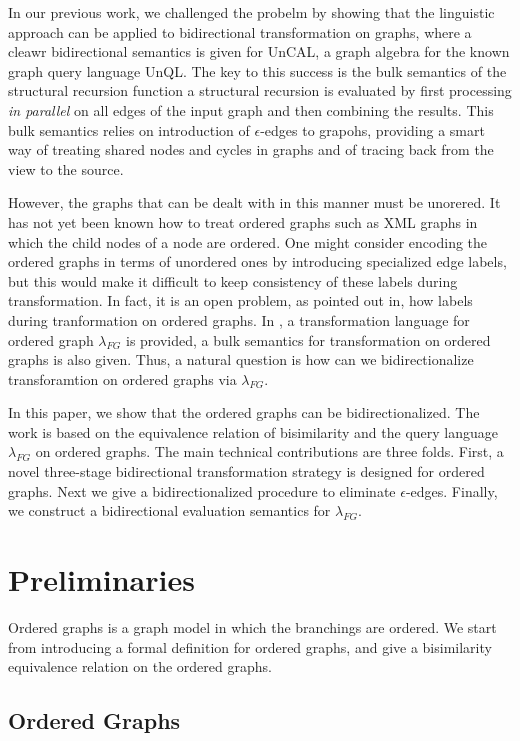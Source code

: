 \documentclass{llncs}
\begin{document}
In our previous work, we challenged the probelm by showing that the linguistic approach can be applied to bidirectional transformation on graphs, where a cleawr bidirectional semantics is given for UnCAL, a graph algebra for the known graph query language UnQL. The key to this success is the bulk semantics of the structural recursion function a structural recursion is evaluated by first processing \emph{in parallel} on all edges of the input graph and then combining the results. This bulk semantics relies on introduction of $\epsilon$-edges to grapohs, providing a smart way of treating shared nodes and cycles in graphs and of tracing back from the view to the source.

However, the graphs that can be dealt with in this manner must be unorered. It has not yet been known how to treat ordered graphs such as XML graphs in which the child nodes of a node are ordered. One might consider encoding the ordered graphs in terms of unordered ones by introducing specialized edge labels, but this would make it difficult to keep consistency of these labels during transformation. In fact, it is an open problem, as pointed out in, how labels during tranformation on ordered graphs. In , a transformation language for ordered graph $\lambda_{FG}$ is provided, a bulk semantics for transformation on ordered graphs is also given. Thus, a natural question is how can we bidirectionalize transforamtion on ordered graphs via $\lambda_{FG}$.

In this paper, we show that the ordered graphs can be bidirectionalized. The work is based on the equivalence relation of bisimilarity and the query language $\lambda_{FG}$ on ordered graphs. The main technical contributions are three folds. First, a novel three-stage bidirectional transformation strategy is designed for ordered graphs. Next we give a bidirectionalized procedure to eliminate $\epsilon$-edges. Finally, we construct a bidirectional evaluation semantics for $\lambda_{FG}$. 

\section{Preliminaries}\label{sec:pre}

Ordered graphs is a graph model in which the branchings are ordered. We start from introducing a formal definition for ordered graphs, and give a bisimilarity equivalence relation on the ordered graphs.

\subsection{Ordered Graphs}\label{subsec:order-graph}
\end{document}
